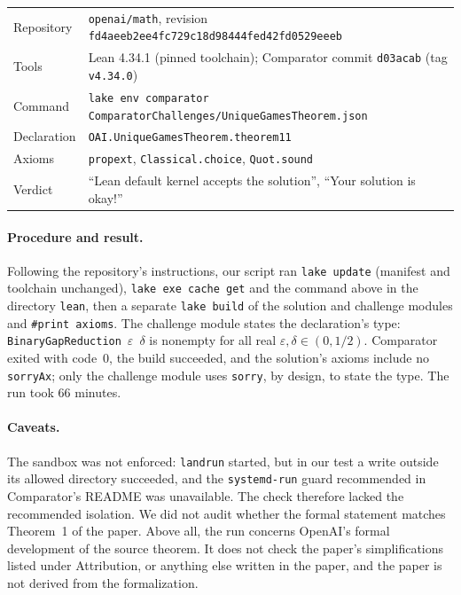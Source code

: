 \documentclass[11pt]{article}
\newcommand{\eps}{\varepsilon}
\begin{document}
\begin{center}
\footnotesize
\begin{tabular}{@{}ll@{}}
Repository & \texttt{openai/math}, revision
 \texttt{fd4aeeb2ee4fc729c18d98444fed42fd0529eeeb}\\
Tools & Lean 4.34.1 (pinned toolchain); Comparator commit \texttt{d03acab}
 (tag \texttt{v4.34.0})\\
Command & \texttt{lake env comparator
 ComparatorChallenges/UniqueGamesTheorem.json}\\
Declaration & \texttt{OAI.UniqueGamesTheorem.theorem11}\\
Axioms & \texttt{propext}, \texttt{Classical.choice},
 \texttt{Quot.sound}\\
Verdict & ``Lean default kernel accepts the solution'', ``Your solution
 is okay!''
\end{tabular}
\end{center}

\paragraph{Procedure and result.} Following the repository's
instructions, our script ran \texttt{lake update} (manifest and toolchain
unchanged), \texttt{lake exe cache get} and the command above in the
directory \texttt{lean}, then a separate \texttt{lake build} of the
solution and challenge modules and \texttt{\#print axioms}. The challenge
module states the declaration's type: \texttt{BinaryGapReduction}~$\eps$~$\delta$
is nonempty for all real $\eps,\delta\in(0,1/2)$. Comparator exited with
code~$0$, the build succeeded, and the solution's axioms include no
\texttt{sorryAx}; only the challenge module uses \texttt{sorry}, by design,
to state the type. The run took 66 minutes.

\paragraph{Caveats.} The sandbox was not enforced: \texttt{landrun}
started, but in our test a write outside its allowed directory succeeded,
and the \texttt{systemd-run} guard recommended in Comparator's README was
unavailable. The check therefore lacked the recommended isolation. We did
not audit whether the formal statement matches Theorem~1 of the paper.
Above all, the run concerns OpenAI's formal development of the source
theorem. It does not check the paper's simplifications listed under
Attribution, or anything else written in the paper, and the paper is not
derived from the formalization.
\end{document}
